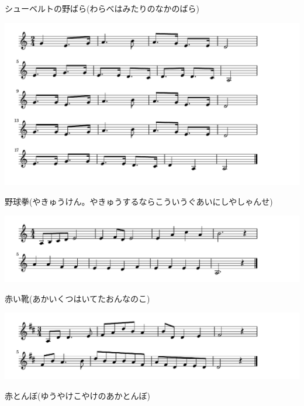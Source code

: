 \documentclass[a4paper]{ltjsarticle}
\begin{document}
\parindent=50pt 
シューベルトの野ばら(わらべはみたりのなかのばら)
\parindent=10pt

\vspace{10mm}

\includegraphics[clip]{yakyuken_crop.pdf}

\vspace{-10mm}

\parindent=50pt 
野球拳(やきゅうけん。やきゅうするならこういうぐあいにしやしゃんせ)
\parindent=10pt

\vspace{10mm}

\includegraphics[clip]{akaikutsu_crop.pdf}

\vspace{-10mm}

\parindent=50pt
赤い靴(あかいくつはいてたおんなのこ)
\parindent=10pt

\vspace{10mm}

\includegraphics[clip]{akatonbo_crop.pdf}

\vspace{-10mm}

\parindent=50pt 
赤とんぼ(ゆうやけこやけのあかとんぼ)
\parindent=10pt
\end{document}
